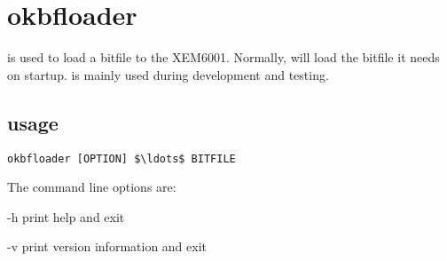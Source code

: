 \section{okbfloader}

 is used to load a bitfile to the XEM6001.
Normally,  will load the bitfile it needs on startup.
 is mainly used during development and testing.

\subsection{usage}

\begin{lstlisting}[mathescape=true]
okbfloader [OPTION] $\ldots$ BITFILE
\end{lstlisting}
The command line options are:
\begin{description*}
	\item[-h]	print help and exit
	\item[-v]	print version information and exit
\end{description*}
